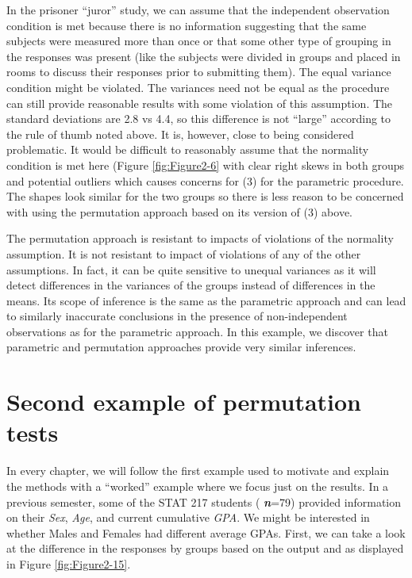 \documentclass[]{book}
\theoremstyle{definition}
\theoremstyle{definition}
\theoremstyle{remark}
\begin{document}
In the prisoner ``juror'' study, we can assume that the independent
observation condition is met because there is no information suggesting
that the same subjects were measured more than once or that some other
type of grouping in the responses was present (like the subjects were
divided in groups and placed in rooms to discuss their responses prior
to submitting them). The equal variance condition might be violated. The
variances need not be equal as the procedure can still provide
reasonable results with some violation of this assumption. The standard
deviations are 2.8 vs 4.4, so this difference is not ``large'' according
to the rule of thumb noted above. It is, however, close to being
considered problematic. It would be difficult to reasonably assume that
the normality condition is met here (Figure \ref{fig:Figure2-6} with
clear right skews in both groups and potential outliers which causes
concerns for (3) for the parametric procedure. The shapes look similar
for the two groups so there is less reason to be concerned with using
the permutation approach based on its version of (3) above.

The permutation approach is resistant to impacts of violations of the
normality assumption. It is not resistant to impact of violations of any
of the other assumptions. In fact, it can be quite sensitive to unequal
variances as it will detect differences in the variances of the groups
instead of differences in the means. Its scope of inference is the same
as the parametric approach and can lead to similarly inaccurate
conclusions in the presence of non-independent observations as for the
parametric approach. In this example, we discover that parametric and
permutation approaches provide very similar inferences.

\section{Second example of permutation tests}\label{section2-7}

In every chapter, we will follow the first example used to motivate and
explain the methods with a ``worked'' example where we focus just on the
results. In a previous semester, some of the STAT 217 students (
\textbf{\emph{n}}=79) provided information on their \emph{Sex},
\emph{Age}, and current cumulative \emph{GPA}. We might be interested in
whether Males and Females had different average GPAs. First, we can take
a look at the difference in the responses by groups based on the output
and as displayed in Figure \ref{fig:Figure2-15}.
\end{document}
